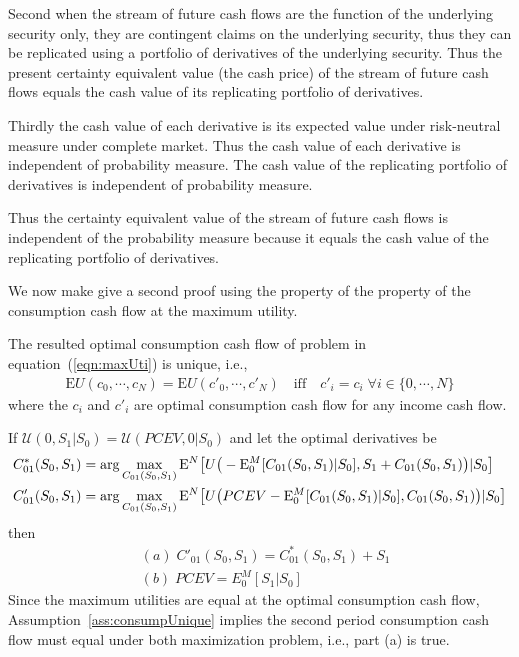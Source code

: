 \documentclass{article}[12pt letter]
\newcommand{\E}{\mathrm{E}}
\begin{document}
Second when the stream of future cash flows are the function of the underlying security only, they are contingent claims on the underlying security, thus they can be replicated using a portfolio of derivatives of the underlying  security. Thus the present certainty equivalent value (the cash price) of the stream of future cash flows equals the cash value of its replicating portfolio of derivatives. 

Thirdly the cash value of each derivative is its expected value under risk-neutral measure under complete market. Thus the cash value of each derivative is independent of probability measure. The cash value of the replicating portfolio of derivatives is independent of probability measure.

Thus the certainty equivalent value of the stream of future cash flows is independent of the probability measure because it equals the cash value of the replicating portfolio of derivatives. 

We now make give a second proof using the property of the property of the consumption cash flow at the maximum utility.

{\assumption \label{ass:consumpUnique} 
The resulted  optimal consumption cash flow of problem in equation~(\ref{eqn:maxUti}) is unique, i.e.,
\begin{align} 
\E U(c_0, \cdots, c_N)  = \E U(c'_0, \cdots, c'_N)  \quad  \mbox{iff} \quad c'_i = c_i \; \forall i \in \{0, \cdots, N \} 
\end{align}
where the $c_i$ and $c'_i$ are optimal consumption cash flow for any income cash flow. 
}

{\lemma If $\mathcal{U}(0,S_1|S_0) = \mathcal{U}(PCEV,0|S_0)$ and let the optimal derivatives  be
\begin{align}
C^*_{01}(S_0,S_1) &= \arg\max_{C_{01}(S_0,S_1)} \E^N\big{[} U\big{(}-\E^M_0[C_{01}(S_0,S_1)|S_0], S_1 + C_{01}(S_0,S_1) \big{)}|S_0\big{]}\\
C'_{01}(S_0,S_1) &= \arg\max_{C_{01}(S_0,S_1)} \E^N\big{[} U\big{(}PCEV-\E^M_0[C_{01}(S_0,S_1)|S_0], C_{01}(S_0,S_1) \big{)}|S_0\big{]}
\end{align}
then  
\begin{align}
& (a) \; C'_{01}(S_0,S_1) = C^*_{01}(S_0,S_1) + S_1 \\
& (b) \; PCEV = E_0^M[S_1|S_0]
\end{align}
}
\proof Since the maximum utilities are equal at the optimal consumption cash flow, Assumption~\ref{ass:consumpUnique} implies the second period consumption cash flow must equal under both maximization problem, i.e., part (a) is true.
\end{document}
